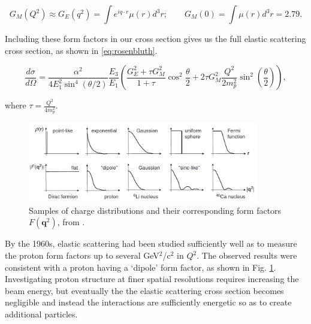         \begin{equation}\label{eq:GM}
             G_M(Q^2) \approx G_E(q^2) = \int e^{iq\cdot r} \mu (r) d^3r;  \quad \quad  G_M(0) = \int  \mu (r) d^3r = 2.79.
        \end{equation}
        
        
        Including these form factors in our cross section gives us the full elastic scattering cross section, as shown in \eqref{eq:rosenbluth}.
                
        \begin{equation}\label{eq:rosenbluth}
            \frac{d\sigma}{d\Omega} = \frac{\alpha^2}{4E_1^2\sin^4{(\theta/2)}}\frac{E_3}{E_1}\left( \frac{G_E^2+\tau G_M^2}{1+\tau} \cos^2{\frac{\theta}{2}}+2\tau G_M^2\frac{Q^2}{2m_p^2}\sin^2(\frac{\theta}{2})\right),
        \end{equation}
       
        where $\tau = \frac{Q^2}{4m_p^2}$.
        

        \begin{figure}[H]
            \centering
            \includegraphics[width=0.9\textwidth]{Chapters/Ch1-Intro/Ch1-Sec1-Background/pics/intro/possibleformfactors.png}
            \caption[Fourier Transforms of Charge Distributions]{Samples of charge distributions and their corresponding form factors $F(\textbf{q}^2)$, from \parencite{Thomson2013ModernPhysics}. }
            \label{fig:formfactors}
        \end{figure}
        

                By the 1960s, elastic scattering had been studied sufficiently well as to measure the proton form factors up to several GeV$^2$/c$^2$ in $Q^2$. The observed results were consistent with a proton having a `dipole' form factor, as shown in Fig. \ref{fig:formfactors}. Investigating proton structure at finer spatial resolutions requires increasing the beam energy, but eventually the the elastic scattering cross section becomes negligible and instead the interactions are sufficiently energetic so as to create additional particles.
                

